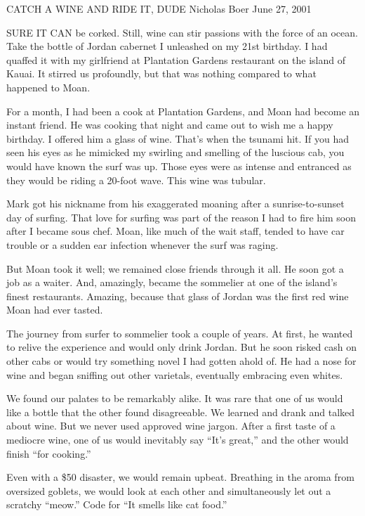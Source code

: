 \documentclass[12pt]{article}
\begin{document}
\noindent
CATCH A WINE AND RIDE IT, DUDE\newline
Nicholas Boer\newline
June 27, 2001

\bigskip
\noindent
SURE IT CAN be corked. Still, wine can stir passions with the force of an ocean. Take the bottle of Jordan cabernet I unleashed on my 21st birthday. I had quaffed it with my girlfriend at Plantation Gardens restaurant on the island of Kauai. It stirred us profoundly, but that was nothing compared to what happened to Moan.

\bigskip
\noindent
For a month, I had been a cook at Plantation Gardens, and Moan had become an instant friend. He was cooking that night and came out to wish me a happy birthday. I offered him a glass of wine. That's when the tsunami hit. If you had seen his eyes as he mimicked my swirling and smelling of the luscious cab, you would have known the surf was up. Those eyes were as intense and entranced as they would be riding a 20-foot wave. This wine was tubular.

\bigskip
\noindent
Mark got his nickname from his exaggerated moaning after a sunrise-to-sunset day of surfing. That love for surfing was part of the reason I had to fire him soon after I became sous chef. Moan, like much of the wait staff, tended to have car trouble or a sudden ear infection whenever the surf was raging.

\bigskip
\noindent
But Moan took it well; we remained close friends through it all. He soon got a job as a waiter. And, amazingly, became the sommelier at one of the island's finest restaurants. Amazing, because that glass of Jordan was the first red wine Moan had ever tasted.

\bigskip
\noindent
The journey from surfer to sommelier took a couple of years. At first, he wanted to relive the experience and would only drink Jordan. But he soon risked cash on other cabs or would try something novel I had gotten ahold of. He had a nose for wine and began sniffing out other varietals, eventually embracing even whites.

\bigskip
\noindent
We found our palates to be remarkably alike. It was rare that one of us would like a bottle that the other found disagreeable. We learned and drank and talked about wine. But we never used approved wine jargon. After a first taste of a mediocre wine, one of us would inevitably say ``It's great,'' and the other would finish ``for cooking.''

\bigskip
\noindent
Even with a \$50 disaster, we would remain upbeat. Breathing in the aroma from oversized goblets, we would look at each other and simultaneously let out a scratchy ``meow.'' Code for ``It smells like cat food.''
\end{document}

